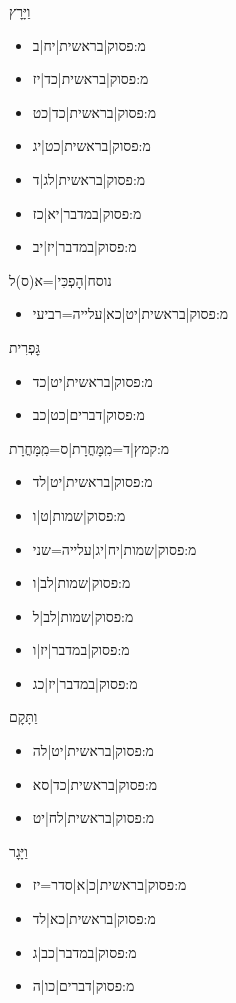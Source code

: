 \begin{itemize}
{{{{{{{{\begin{itemize}
\end{itemize}
 \item וַיָּרׇץ
\begin{itemize} \item {{מ:פסוק|בראשית|יח|ב}}\item {{מ:פסוק|בראשית|כד|יז}}\item {{מ:פסוק|בראשית|כד|כט}}\item {{מ:פסוק|בראשית|כט|יג}}\item {{מ:פסוק|בראשית|לג|ד}}\item {{מ:פסוק|במדבר|יא|כז}}\item {{מ:פסוק|במדבר|יז|יב}}
\end{itemize}
 \item {{נוסח|הׇפְכִּי|=א(ס)ל
\begin{itemize} \item {{מ:פסוק|בראשית|יט|כא|עלייה=רביעי}}
\end{itemize}
 \item גׇּפְרִית
\begin{itemize} \item {{מ:פסוק|בראשית|יט|כד}}\item {{מ:פסוק|דברים|כט|כב}}
\end{itemize}
 \item {{מ:קמץ|ד=מִֽמׇּחֳרָת|ס=מִֽמָּחֳרָת}}
\begin{itemize} \item {{מ:פסוק|בראשית|יט|לד}}\item {{מ:פסוק|שמות|ט|ו}}\item {{מ:פסוק|שמות|יח|יג|עלייה=שני}}\item {{מ:פסוק|שמות|לב|ו}}\item {{מ:פסוק|שמות|לב|ל}}\item {{מ:פסוק|במדבר|יז|ו}}\item {{מ:פסוק|במדבר|יז|כג}}
\end{itemize}
 \item וַתָּקׇם
\begin{itemize} \item {{מ:פסוק|בראשית|יט|לה}}\item {{מ:פסוק|בראשית|כד|סא}}\item {{מ:פסוק|בראשית|לח|יט}}
\end{itemize}
 \item וַיָּגׇר
\begin{itemize} \item {{מ:פסוק|בראשית|כ|א|סדר=יז}}\item {{מ:פסוק|בראשית|כא|לד}}\item {{מ:פסוק|במדבר|כב|ג}}\item {{מ:פסוק|דברים|כו|ה}}

\end{itemize}}}}}}}}}}}
\end{itemize}
